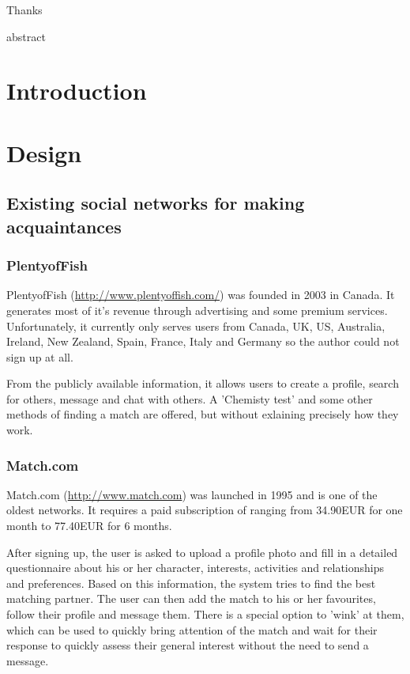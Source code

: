 \documentclass[12pt,oneside]{fithesis}
\begin{document}
\FrontMatter
\ThesisTitlePage

\begin{ThesisDeclaration}
\DeclarationText
\AdvisorName
\end{ThesisDeclaration}

\begin{ThesisThanks}
Thanks
\end{ThesisThanks}

abstract

\MainMatter
\tableofcontents
\chapter*{Introduction}
\chapter{Design}
\section{Existing social networks for making acquaintances}
	\subsection{PlentyofFish}
		PlentyofFish (\url{http://www.plentyoffish.com/}) was founded in 2003 in Canada. It generates most of it's revenue through advertising and some premium services. Unfortunately, it currently only serves users from Canada, UK, US, Australia, Ireland, New Zealand, Spain, France, Italy and Germany so the author could not sign up at all.
		
		From the publicly available information, it allows users to create a profile, search for others, message and chat with others. A 'Chemisty test' and some other methods of finding a match are offered, but without exlaining precisely how they work.\cite{website:pof}
		\subsection{Match.com}
		Match.com (\url{http://www.match.com}) was launched in 1995 and is one of the oldest networks. It requires a paid subscription of ranging from 34.90EUR for one month  to 77.40EUR for 6 months.
		
		After signing up, the user is asked to upload a profile photo and fill in a detailed questionnaire about his or her character, interests, activities and relationships and preferences. Based on this information, the system tries to find the best matching partner. The user can then add the match to his or her favourites, follow their profile and message them. There is a special option to 'wink' at them, which can be used to quickly bring attention of the match and wait for their response to quickly assess their general interest without the need to send a message.\cite{website:match}
		
\end{document}
